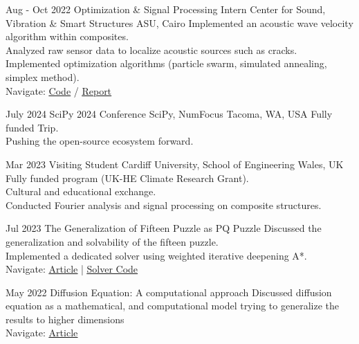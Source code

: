 \documentclass[hidelinks]{report}
\begin{document}
\entry
    {Aug - Oct 2022}
    {Optimization \& Signal Processing Intern}
    {Center for Sound, Vibration \& Smart Structures}
    {ASU, Cairo}
    {
      \textbullet Implemented an acoustic wave velocity algorithm within composites.\\
      \textbullet Analyzed raw sensor data to localize acoustic sources such as cracks. \\
      \textbullet Implemented optimization algorithms (particle swarm, simulated annealing, simplex method).\\
      \textbullet Navigate: 
      \href{\github/AE-software.git}{\underline{Code}} / %
      \href{\github/AE-software/blob/master/Final-Report/Report.pdf}{\underline{Report}}
    }

\vspace{2mm}


\entry
    {July 2024}
    {SciPy 2024 Conference}  
    {SciPy, NumFocus}
    {Tacoma, WA, USA}
    {
      \textbullet Fully funded Trip.\\
      \textbullet Pushing the open-source ecosystem forward.
    }

\entry
    {Mar 2023}
    {Visiting Student}
    {Cardiff University, School of Engineering}
    {Wales, UK}
    {
      \textbullet Fully funded program (UK-HE Climate Research Grant). \\
      \textbullet Cultural and educational exchange. \\
      \textbullet Conducted Fourier analysis and signal processing on composite structures. \\ 
    }


\vspace{2mm}
\newpage 
{}

\entry
    {Jul 2023}
    {The Generalization of Fifteen Puzzle as PQ Puzzle}  
    {} {}
    {
      \textbullet Discussed the generalization and solvability of the fifteen puzzle.\\
      \textbullet Implemented a dedicated solver using weighted iterative deepening A*.\\
      \textbullet Navigate:  \href{\blog/fifteen-puzzle}{\underline{Article}} | 
      \href{\github/fifteen-puzzle-solver}{\underline{Solver Code}}
    } 


\entry
    {May 2022}
    {Diffusion Equation: A computational approach}  
    {} 
    {}
    {
        \textbullet Discussed diffusion equation as a mathematical, and computational
        model trying to generalize the results to higher dimensions \\
        \textbullet Navigate: \href{\blog/diffusion}{\underline{Article}}
    }
\end{document}
